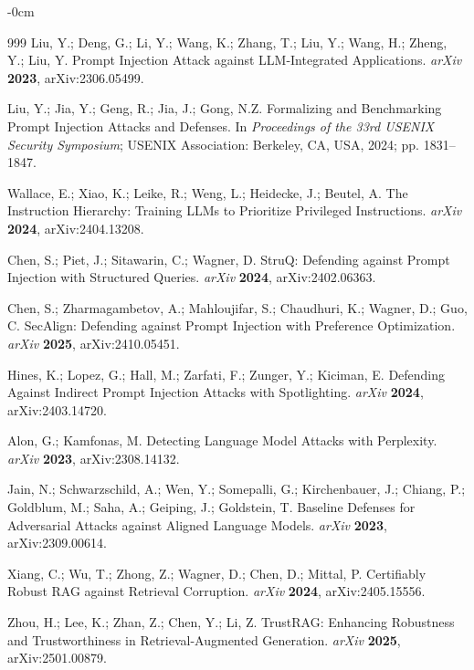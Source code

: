 \documentclass[information,article,submit,moreauthors]{Definitions/mdpi}
\begin{document}
\begin{adjustwidth}{-\extralength}{0cm}
\begin{thebibliography}{999}
Liu, Y.; Deng, G.; Li, Y.; Wang, K.; Zhang, T.; Liu, Y.; Wang, H.; Zheng, Y.; Liu, Y. Prompt
Injection Attack against LLM-Integrated Applications. \textit{arXiv} \textbf{2023},
arXiv:2306.05499.

Liu, Y.; Jia, Y.; Geng, R.; Jia, J.; Gong, N.Z. Formalizing and Benchmarking Prompt Injection
Attacks and Defenses. In \textit{Proceedings of the 33rd USENIX Security Symposium}; USENIX
Association: Berkeley, CA, USA, 2024; pp. 1831--1847.

Wallace, E.; Xiao, K.; Leike, R.; Weng, L.; Heidecke, J.; Beutel, A. The Instruction Hierarchy:
Training LLMs to Prioritize Privileged Instructions. \textit{arXiv} \textbf{2024},
arXiv:2404.13208.

Chen, S.; Piet, J.; Sitawarin, C.; Wagner, D. StruQ: Defending against Prompt Injection with
Structured Queries. \textit{arXiv} \textbf{2024}, arXiv:2402.06363.

Chen, S.; Zharmagambetov, A.; Mahloujifar, S.; Chaudhuri, K.; Wagner, D.; Guo, C. SecAlign:
Defending against Prompt Injection with Preference Optimization. \textit{arXiv} \textbf{2025},
arXiv:2410.05451.

Hines, K.; Lopez, G.; Hall, M.; Zarfati, F.; Zunger, Y.; Kiciman, E. Defending Against Indirect
Prompt Injection Attacks with Spotlighting. \textit{arXiv} \textbf{2024}, arXiv:2403.14720.

Alon, G.; Kamfonas, M. Detecting Language Model Attacks with Perplexity. \textit{arXiv}
\textbf{2023}, arXiv:2308.14132.

Jain, N.; Schwarzschild, A.; Wen, Y.; Somepalli, G.; Kirchenbauer, J.; Chiang, P.; Goldblum, M.;
Saha, A.; Geiping, J.; Goldstein, T. Baseline Defenses for Adversarial Attacks against Aligned
Language Models. \textit{arXiv} \textbf{2023}, arXiv:2309.00614.


Xiang, C.; Wu, T.; Zhong, Z.; Wagner, D.; Chen, D.; Mittal, P. Certifiably Robust RAG against
Retrieval Corruption. \textit{arXiv} \textbf{2024}, arXiv:2405.15556.

Zhou, H.; Lee, K.; Zhan, Z.; Chen, Y.; Li, Z. TrustRAG: Enhancing Robustness and
Trustworthiness in Retrieval-Augmented Generation. \textit{arXiv} \textbf{2025},
arXiv:2501.00879.


\end{thebibliography}
\end{adjustwidth}
\end{document}
